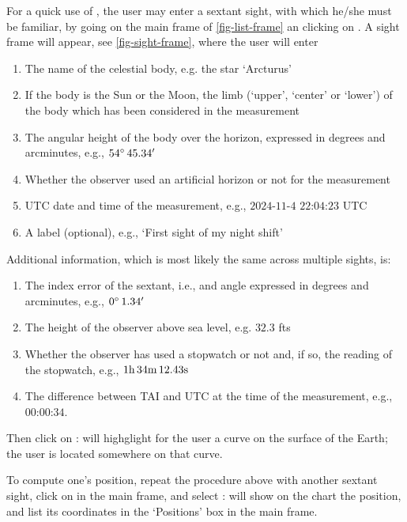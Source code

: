 \documentclass{ol-softwaremanual}
\begin{document}
For a quick use of \thel, the user may enter a sextant sight, with which he/she must be familiar, by going on the main frame of \cref{fig-list-frame} an clicking on . A sight frame will appear, see \cref{fig-sight-frame}, where the user will enter
\begin{enumerate}
  \item \label{item-name} The name of the celestial body, e.g. the star `Arcturus'
  \item \label{item-limb}  If the body is the Sun or the Moon, the limb (`upper', `center' or `lower') of the body which has been considered in the measurement
  \item \label{item-body-height} The angular height of the  body over the horizon, expressed in degrees and arcminutes, e.g., $54 \degree \, 45.34'$
  \item \label{item-artificial-horizon} Whether the observer used an artificial horizon or not for the measurement
  \item \label{item-time} \ac{UTC} date and time of the measurement, e.g., $2024$-$11$-$4$ $22$:$04$:$23$ \ac{UTC}
  \item \label{item-label} A label (optional), e.g., `First sight of my night shift'
  \end{enumerate}
  
  Additional information, which is most likely the same across multiple sights, is: 
  \begin{enumerate}[resume]
    \item \label{item-index-error} The index error \cite{bowditch2002the} of the sextant,  i.e., and angle expressed in degrees and arcminutes, e.g., $0 \degree \, 1.34'$
    \item \label{item-observer-height} The height of the observer above sea level, e.g. $32.3$ \acp{ft}
    \item \label{item-stopwatch} Whether the observer has used a stopwatch or not and, if so, the reading of the stopwatch, e.g., $1\textrm{h} \, 34 \textrm{m} \, 12.43 \textrm{s}$
    \item \label{item-tai-utc} The difference between \ac{TAI} and \ac{UTC} at the time of the measurement, e.g., $00$:$00$:$34$. 
  \end{enumerate}

  Then click on : \thel will highglight for the user a curve on the surface of the Earth; the user is located somewhere on that curve. 

To compute one's position, repeat the procedure above with another sextant sight, click on  in the main frame, and select : \thel will show on the chart the position, and list its coordinates in the `Positions' box in the main frame. 
\end{document}
